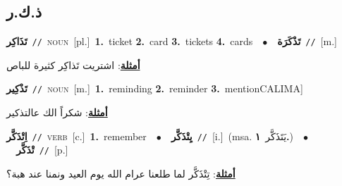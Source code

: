 \documentclass[10pt,a4paper,twoside]{article} %
\begin{document}
\begin{multicols}{2}
{{{{\vspace{-3mm}
\subsection*{\color{blue}\foreignlanguage{arabic}{ذ.ك.ر}\color{blue}{}} 

{\setlength\topsep{0pt}\textbf{\foreignlanguage{arabic}{تَذَاكِر}}\ {\color{gray}\texttt{//}\color{black}}\ \textsc{noun}\ [pl.]\ \textbf{1.}~ticket  \textbf{2.}~card  \textbf{3.}~tickets  \textbf{4.}~cards\ \ $\bullet$\ \ \setlength\topsep{0pt}\textbf{\foreignlanguage{arabic}{تَذْكَرَة}}\ {\color{gray}\texttt{//}\color{black}}\ [m.]\  \begin{flushright}\color{gray}\foreignlanguage{arabic}{\textbf{\underline{\foreignlanguage{arabic}{أمثلة}}}: اشتريت تَذاكِر كثيرة للباص}\end{flushright}\color{black}} \vspace{2mm}

{\setlength\topsep{0pt}\textbf{\foreignlanguage{arabic}{تَذْكِير}}\ {\color{gray}\texttt{//}\color{black}}\ \textsc{noun}\ [m.]\ \textbf{1.}~reminding  \textbf{2.}~reminder  \textbf{3.}~mentionCALIMA]\  \begin{flushright}\color{gray}\foreignlanguage{arabic}{\textbf{\underline{\foreignlanguage{arabic}{أمثلة}}}: شكراً الك عالتذكير}\end{flushright}\color{black}} \vspace{2mm}

{\setlength\topsep{0pt}\textbf{\foreignlanguage{arabic}{اِتْذَكَّر}}\ {\color{gray}\texttt{//}\color{black}}\ \textsc{verb}\ [c.]\ \textbf{1.}~remember\ \ $\bullet$\ \ \setlength\topsep{0pt}\textbf{\foreignlanguage{arabic}{يِتْذَكَّر}}\ {\color{gray}\texttt{//}\color{black}}\ [i.]\ \color{gray}(msa. \foreignlanguage{arabic}{يَتَذَكَّر}~\foreignlanguage{arabic}{\textbf{١.}})\color{black}\ \ $\bullet$\ \ \setlength\topsep{0pt}\textbf{\foreignlanguage{arabic}{تْذَكَّر}}\ {\color{gray}\texttt{//}\color{black}}\ [p.]\  \begin{flushright}\color{gray}\foreignlanguage{arabic}{\textbf{\underline{\foreignlanguage{arabic}{أمثلة}}}: تِتْذَكَّر لما طلعنا عرام الله يوم العيد ونمنا عند هبة؟}\end{flushright}\color{black}} \vspace{2mm}

}}}}
\end{multicols}
\end{document}
